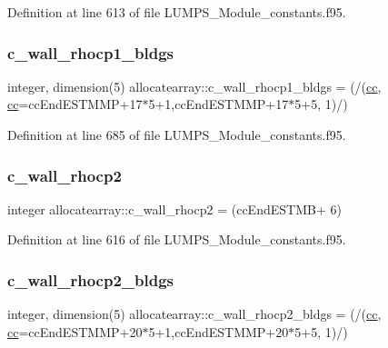 Definition at line 613 of file L\+U\+M\+P\+S\+\_\+\+Module\+\_\+constants.\+f95.

\mbox{\label{namespaceallocatearray_a5824f50ff58d28c3b0b4326a2ccfe541}} 
\subsubsection{\texorpdfstring{c\+\_\+wall\+\_\+rhocp1\+\_\+bldgs}{c\_wall\_rhocp1\_bldgs}}
{\footnotesize\ttfamily integer, dimension(5) allocatearray\+::c\+\_\+wall\+\_\+rhocp1\+\_\+bldgs = (/(\hyperlink{namespaceallocatearray_ac863c81704eb507dee10f5e10741e10c}{cc}, \hyperlink{namespaceallocatearray_ac863c81704eb507dee10f5e10741e10c}{cc}=cc\+End\+E\+S\+T\+M\+MP+17$\ast$5+1,cc\+End\+E\+S\+T\+M\+MP+17$\ast$5+5, 1)/)}



Definition at line 685 of file L\+U\+M\+P\+S\+\_\+\+Module\+\_\+constants.\+f95.

\mbox{\label{namespaceallocatearray_af2c229fa0f3dc62614415cf32458b8a2}} 
\subsubsection{\texorpdfstring{c\+\_\+wall\+\_\+rhocp2}{c\_wall\_rhocp2}}
{\footnotesize\ttfamily integer allocatearray\+::c\+\_\+wall\+\_\+rhocp2 = (cc\+End\+E\+S\+T\+MB+ 6)}



Definition at line 616 of file L\+U\+M\+P\+S\+\_\+\+Module\+\_\+constants.\+f95.

\mbox{\label{namespaceallocatearray_af8543b34d920034e2761a01b4e6f1db5}} 
\subsubsection{\texorpdfstring{c\+\_\+wall\+\_\+rhocp2\+\_\+bldgs}{c\_wall\_rhocp2\_bldgs}}
{\footnotesize\ttfamily integer, dimension(5) allocatearray\+::c\+\_\+wall\+\_\+rhocp2\+\_\+bldgs = (/(\hyperlink{namespaceallocatearray_ac863c81704eb507dee10f5e10741e10c}{cc}, \hyperlink{namespaceallocatearray_ac863c81704eb507dee10f5e10741e10c}{cc}=cc\+End\+E\+S\+T\+M\+MP+20$\ast$5+1,cc\+End\+E\+S\+T\+M\+MP+20$\ast$5+5, 1)/)}



